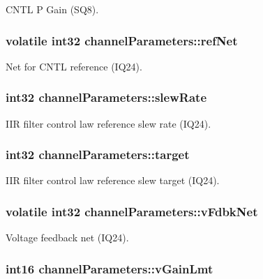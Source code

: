 C\-N\-T\-L P Gain (S\-Q8). \hypertarget{structchannel_parameters_a8e3dbb10da7b72b7b4fe6c200fbb495c}{
\subsubsection[{ref\-Net}]{\setlength{\rightskip}{0pt plus 5cm}volatile int32 channel\-Parameters\-::ref\-Net}}\label{structchannel_parameters_a8e3dbb10da7b72b7b4fe6c200fbb495c}
Net for C\-N\-T\-L reference (I\-Q24). \hypertarget{structchannel_parameters_a09eb121ecb75a652f7689869d1685a30}{
\subsubsection[{slew\-Rate}]{\setlength{\rightskip}{0pt plus 5cm}int32 channel\-Parameters\-::slew\-Rate}}\label{structchannel_parameters_a09eb121ecb75a652f7689869d1685a30}
I\-I\-R filter control law reference slew rate (I\-Q24). \hypertarget{structchannel_parameters_a2d9b0f07810affea40c8502613b8984e}{
\subsubsection[{target}]{\setlength{\rightskip}{0pt plus 5cm}int32 channel\-Parameters\-::target}}\label{structchannel_parameters_a2d9b0f07810affea40c8502613b8984e}
I\-I\-R filter control law reference slew target (I\-Q24). \hypertarget{structchannel_parameters_a5b3f0afc0e3ef0bc0726ee695570e787}{
\subsubsection[{v\-Fdbk\-Net}]{\setlength{\rightskip}{0pt plus 5cm}volatile int32 channel\-Parameters\-::v\-Fdbk\-Net}}\label{structchannel_parameters_a5b3f0afc0e3ef0bc0726ee695570e787}
Voltage feedback net (I\-Q24). \hypertarget{structchannel_parameters_a7dd5ddd959b3f3344721e729e51f0db5}{
\subsubsection[{v\-Gain\-Lmt}]{\setlength{\rightskip}{0pt plus 5cm}int16 channel\-Parameters\-::v\-Gain\-Lmt}}\label{structchannel_parameters_a7dd5ddd959b3f3344721e729e51f0db5}
